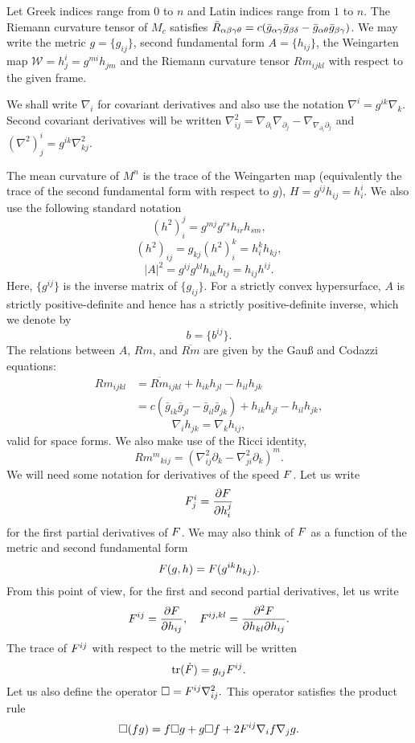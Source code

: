 \documentclass{amsart}
\begin{document}
Let Greek indices range from \(0\) to \(n\) and Latin indices range from \(1\) to \(n\). The Riemann curvature tensor of \(M_c\) satisfies \(\bar{R}_{\alpha\beta\gamma\theta} = c(\bar{g}_{\alpha\gamma}\bar{g}_{\beta\delta} - \bar{g}_{\alpha\theta}\bar{g}_{\beta\gamma})\). We may write the metric $g = \{g_{ij}\}$, second fundamental form $A = \{h_{ij}\}$, the Weingarten map $\mathcal{W} = h^i_j = g^{mi} h_{jm}$ and the Riemann curvature tensor $Rm_{ijkl}$ with respect to the given frame.

We shall write \(\nabla_i\) for covariant derivatives and also use the notation \(\nabla^i = g^{ik} \nabla_k\). Second covariant derivatives will be written \(\nabla^2_{ij} = \nabla_{\partial_i} \nabla_{\partial_j} - \nabla_{\nabla_{\partial_i} \partial_j}\) and \((\nabla^2)^i_j = g^{ik} \nabla^2_{kj}\).

The mean curvature of $M^n$ is the trace of the Weingarten map (equivalently the trace of the second fundamental form with respect to $g$), $H = g^{ij}h_{ij} = h^i_i$. We also use the following standard notation
\[
(h^2)_i^j = g^{mj}g^{rs}h_{ir}h_{sm},
\]
\[
(h^2)_{ij} = g_{kj} (h^2)_i^k = h^k_i h_{kj},
\]
\[
|A|^2 = g^{ij}g^{kl}h_{ik}h_{lj} = h_{ij}h^{ij}.
\]
Here, $\{g^{ij}\}$ is the inverse matrix of $\{g_{ij}\}.$ For a strictly convex hypersurface, \(A\) is strictly positive-definite and hence has a strictly positive-definite inverse, which we denote by
\[
b = \{b^{ij}\}.
\]
The relations between $A$, $Rm$, and $\overline{Rm}$ are given by the Gau{\ss} and Codazzi equations:
\[
\begin{split}
Rm_{ijkl} &= \overline{Rm}_{ijkl} + h_{ik}h_{jl} - h_{il}h_{jk} \\
&= c(\bar{g}_{ik}\bar{g}_{jl} - \bar{g}_{il}\bar{g}_{jk}) + h_{ik}h_{jl} - h_{il}h_{jk},
\end{split}
\]
\[
\nabla_i h_{jk} = \nabla_k h_{ij},
\]
valid for space forms. We also make use of the Ricci identity,
\[
{Rm^m}_{kij}  = \left(\nabla^2_{ij} \partial_k - \nabla^2_{ji} \partial_k\right)^m.
\]
We will need some notation for derivatives of the speed \(F\). Let us write
\[
F^{i}_{j} = \frac{\partial F}{\partial h^{j}_{i}}
\]
for the first partial derivatives of \(F\). We may also think of \(F\) as a function of the metric and second fundamental form
\[
F(g, h) = F(g^{ik} h_{kj}).
\]
From this point of view, for the first and second partial derivatives, let us write
\[
F^{ij} = \frac{\partial F}{\partial h_{ij}}, \quad F^{ij,kl} = \frac{\partial^2F}{\partial h_{kl} \partial h_{ij}}.
\]
The trace of \(F^{ij}\) with respect to the metric will be written
\[
\operatorname{tr}(\dot{F}) = g_{ij} F^{ij}.
\]
Let us also define the operator
$
\Box = F^{ij} \nabla^2_{ij}.
$
This operator satisfies the product rule
\begin{equation}
\label{eq:productbox}
\Box (fg) = f \Box g + g \Box f + 2 F^{ij} \nabla_i f \nabla_j g.
\end{equation}
\end{document}
